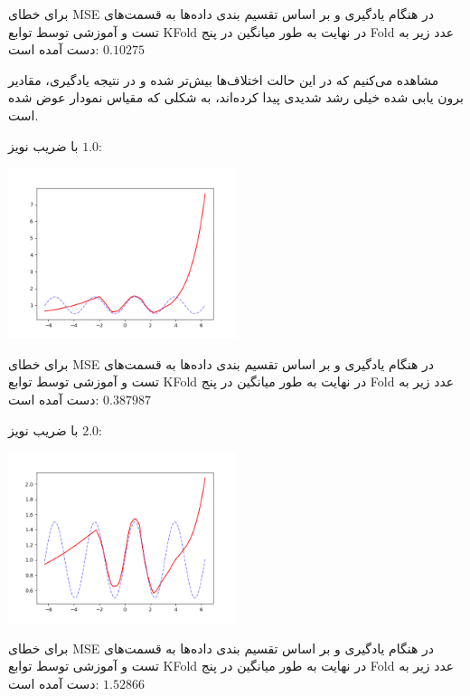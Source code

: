 \documentclass[12pt,titlepage,a4page , tikz , multi,table , svgnames,xcdraw]{article}
\begin{document}
برای خطای MSE در هنگام یادگیری و بر اساس تقسیم بندی داده‌ها به قسمت‌های تست و آموزشی توسط توابع KFold در نهایت به طور میانگین در پنج Fold عدد زیر به دست آمده است:
$ 0.10275$

مشاهده می‌کنیم که در این حالت اختلاف‌ها بیش‌تر شده و در نتیجه یادگیری، مقادیر برون یابی شده خیلی رشد شدیدی پیدا کرده‌اند، به شکلی که مقیاس نمودار عوض شده است.





\hrulefill

\newpage

با ضریب نویز $1.0$: 
\begin{center}

 \includegraphics[width=0.5\textwidth]{pictures/8.png}

\end{center}

برای خطای MSE در هنگام یادگیری و بر اساس تقسیم بندی داده‌ها به قسمت‌های تست و آموزشی توسط توابع KFold در نهایت به طور میانگین در پنج Fold عدد زیر به دست آمده است:
$ 0.387987$



\hrulefill



با ضریب نویز $2.0$: 
\begin{center}

 \includegraphics[width=0.5\textwidth]{pictures/9.png}

\end{center}

برای خطای MSE در هنگام یادگیری و بر اساس تقسیم بندی داده‌ها به قسمت‌های تست و آموزشی توسط توابع KFold در نهایت به طور میانگین در پنج Fold عدد زیر به دست آمده است:
$ 1.52866$
\end{document}
